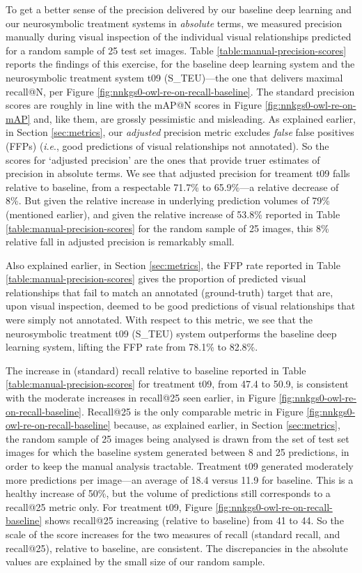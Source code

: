 \documentclass[]{jair}
\newcommand{\ie}{\textit{i}.\textit{e}.,\xspace}
\begin{document}
To get a better sense of the precision delivered by our baseline deep learning and our neurosymbolic treatment systems in \emph{absolute} terms, we measured precision manually during visual inspection of the individual visual relationships predicted for a random sample of 25 test set images.
Table \ref{table:manual-precision-scores} reports the findings of this exercise, for the baseline deep learning system and the neurosymbolic treatment system t09 (S\_TEU)---the one that delivers maximal recall@N, per Figure \ref{fig:nnkgs0-owl-re-on-recall-baseline}. 
The standard precision scores are roughly in line with the mAP@N scores in Figure \ref{fig:nnkgs0-owl-re-on-mAP} and, like them, are grossly pessimistic and misleading.
As explained earlier, in Section \ref{sec:metrics}, our \emph{adjusted} precision metric excludes \emph{false} false positives (FFPs) (\ie good predictions of visual relationships not annotated).
So the scores for `adjusted precision' are the ones that provide truer estimates of precision in absolute terms.
We see that adjusted precision for treament t09 falls relative to baseline, from a respectable 71.7\% to 65.9\%---a relative decrease of 8\%.
But given the relative increase in underlying prediction volumes of 79\% (mentioned earlier), and given the relative increase of 53.8\% reported in Table \ref{table:manual-precision-scores} for the random sample of 25 images, this 8\% relative fall in adjusted precision is remarkably small. 

Also explained earlier, in Section \ref{sec:metrics}, the FFP rate reported in Table \ref{table:manual-precision-scores} gives the proportion of predicted visual relationships that fail to match an annotated (ground-truth) target that are, upon visual inspection, deemed to be good predictions of visual relationships that were simply not annotated.
With respect to this metric, we see that the neurosymbolic treatment t09 (S\_TEU) system outperforms the baseline deep learning system, lifting the FFP rate from 78.1\% to 82.8\%.

The increase in (standard) recall relative to baseline reported in Table \ref{table:manual-precision-scores} for treatment t09, from 47.4 to 50.9, is consistent with the moderate increases in recall@25 seen earlier, in Figure \ref{fig:nnkgs0-owl-re-on-recall-baseline}.
Recall@25 is the only comparable metric in Figure \ref{fig:nnkgs0-owl-re-on-recall-baseline} because, as explained earlier, in Section \ref{sec:metrics}, the random sample of 25 images being analysed is drawn from the set of test set images for which the baseline system generated between 8 and 25 predictions, in order to keep the manual analysis tractable.
Treatment t09 generated moderately more predictions per image---an average of 18.4 versus 11.9 for baseline.
This is a healthy increase of 50\%, but the volume of predictions still corresponds to a recall@25 metric only.
For treatment t09, Figure \ref{fig:nnkgs0-owl-re-on-recall-baseline} shows recall@25 increasing (relative to baseline) from 41 to 44.
So the scale of the score increases for the two measures of recall (standard recall, and recall@25), relative to baseline, are consistent.
The discrepancies in the absolute values are explained by the small size of our random sample.
\end{document}
